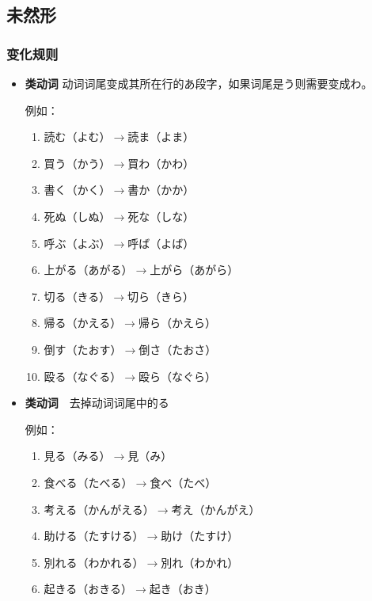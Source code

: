 \subsection{未然形}

\subsubsection{变化规则}
\begin{itemize}
    \item {\bfseries \I 类动词} 动词词尾变成其所在行的あ段字，如果词尾是う则需要变成わ。
    
    例如：
    \begin{multicols}{2}
        \begin{enumerate}
            \item 読む（よむ）$\longrightarrow$読ま（よま）
            \item 買う（かう）$\longrightarrow$買わ（かわ）
            \item 書く（かく）$\longrightarrow$書か（かか）
            \item 死ぬ（しぬ）$\longrightarrow$死な（しな）
            \item 呼ぶ（よぶ）$\longrightarrow$呼ば（よば）
            \item 上がる（あがる）$\longrightarrow$上がら（あがら）
            \item 切る（きる）$\longrightarrow$切ら（きら）
            \item 帰る（かえる）$\longrightarrow$帰ら（かえら）
            \item 倒す（たおす）$\longrightarrow$倒さ（たおさ）
            \item 殴る（なぐる）$\longrightarrow$殴ら（なぐら）
        \end{enumerate}

    \end{multicols}

    \item {\bfseries \II 类动词}　去掉动词词尾中的る
    
    例如：
    \begin{multicols}{2}
        \begin{enumerate}
            \item 見る（みる）$\longrightarrow$見（み）
            \item 食べる（たべる）$\longrightarrow$食べ（たべ）
            \item 考える（かんがえる）$\longrightarrow$考え（かんがえ）
            \item 助ける（たすける）$\longrightarrow$助け（たすけ）
            \item 別れる（わかれる）$\longrightarrow$別れ（わかれ）
            \item 起きる（おきる）$\longrightarrow$起き（おき）
        \end{enumerate}


\end{multicols}
\end{itemize}
